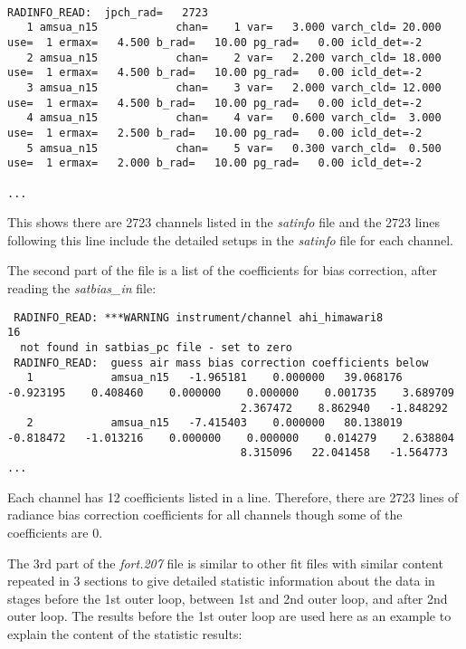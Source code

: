 \begin{tiny}
\begin{verbatim}

RADINFO_READ:  jpch_rad=   2723
   1 amsua_n15            chan=    1 var=   3.000 varch_cld= 20.000 use=  1 ermax=   4.500 b_rad=   10.00 pg_rad=   0.00 icld_det=-2
   2 amsua_n15            chan=    2 var=   2.200 varch_cld= 18.000 use=  1 ermax=   4.500 b_rad=   10.00 pg_rad=   0.00 icld_det=-2
   3 amsua_n15            chan=    3 var=   2.000 varch_cld= 12.000 use=  1 ermax=   4.500 b_rad=   10.00 pg_rad=   0.00 icld_det=-2
   4 amsua_n15            chan=    4 var=   0.600 varch_cld=  3.000 use=  1 ermax=   2.500 b_rad=   10.00 pg_rad=   0.00 icld_det=-2
   5 amsua_n15            chan=    5 var=   0.300 varch_cld=  0.500 use=  1 ermax=   2.000 b_rad=   10.00 pg_rad=   0.00 icld_det=-2

...
\end{verbatim}
\end{tiny}

This shows there are 2723 channels listed in the \textit{satinfo} file and the 2723 lines following this line include the detailed setups in the \textit{satinfo} file for each channel.

The second part of the file is a list of the coefficients for bias correction, after reading the \textit{satbias\_in} file:

\begin{tiny}
\begin{verbatim}
 RADINFO_READ: ***WARNING instrument/channel ahi_himawari8                 16
  not found in satbias_pc file - set to zero
 RADINFO_READ:  guess air mass bias correction coefficients below
   1            amsua_n15   -1.965181    0.000000   39.068176   -0.923195    0.408460    0.000000    0.000000    0.001735    3.689709    
                                    2.367472    8.862940   -1.848292
   2            amsua_n15   -7.415403    0.000000   80.138019   -0.818472   -1.013216    0.000000    0.000000    0.014279    2.638804    
                                    8.315096   22.041458   -1.564773
...
\end{verbatim}
\end{tiny}

Each channel has 12 coefficients listed in a line. Therefore, there are 2723 lines of radiance bias correction coefficients for all channels though some of the coefficients are 0.

The 3rd part of the \textit{fort.207} file is similar to other fit files with similar content repeated in 3 sections to give detailed statistic information about the data in stages before the 1st outer loop, between 1st and 2nd outer loop, and after 2nd outer loop. The results before the 1st outer loop are used here as an example to explain the content of the statistic results:

